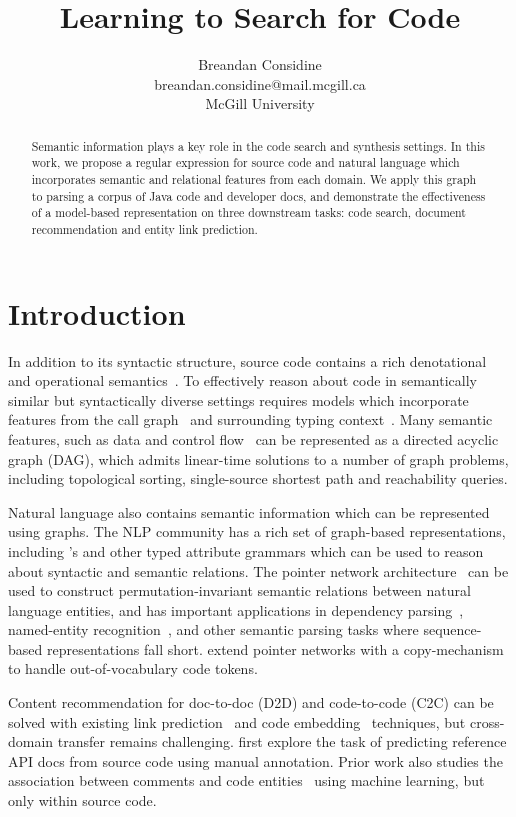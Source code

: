 \documentclass{article}
\title{Learning to Search for Code}
\author{Breandan Considine\\
breandan.considine@mail.mcgill.ca\\
McGill University}
\begin{document}
\maketitle

\begin{abstract}
Semantic information plays a key role in the code search and synthesis settings. In this work, we propose a regular expression for source code and natural language which incorporates semantic and relational features from each domain. We apply this graph to parsing a corpus of Java code and developer docs, and demonstrate the effectiveness of a model-based representation on three downstream tasks: code search, document recommendation and entity link prediction.
\end{abstract}

\section{Introduction}

In addition to its syntactic structure, source code contains a rich denotational and operational semantics~\citep{henkel2018code}. To effectively reason about code in semantically similar but syntactically diverse settings requires models which incorporate features from the call graph~\citep{gu2016deep, liu2019neural} and surrounding typing context~\citep{allamanis2017learning}. Many semantic features, such as data and control flow~\citep{si2018learning} can be represented as a directed acyclic graph (DAG), which admits linear-time solutions to a number of graph problems, including topological sorting, single-source shortest path and reachability queries.

Natural language also contains semantic information which can be represented using graphs. The NLP community has a rich set of graph-based representations, including \citet{reddy2016transforming}'s and other typed attribute grammars which can be used to reason about syntactic and semantic relations. The pointer network architecture~\citep{vinyals2015pointer, vinyals2015order} can be used to construct permutation-invariant semantic relations between natural language entities, and has important applications in dependency parsing~\citep{ma2018stack}, named-entity recognition~\citep{lample2016neural}, and other semantic parsing tasks where sequence-based representations fall short. \citet{li2017code} extend pointer networks with a copy-mechanism to handle out-of-vocabulary code tokens.

Content recommendation for doc-to-doc (D2D) and code-to-code (C2C) can be solved with existing link prediction~\citep{zhang2018link} and code embedding~\citep{gu2018deep} techniques, but cross-domain transfer remains challenging. \citet{robillard2015recommending, robillard2017demand} first explore the task of predicting reference API docs from source code using manual annotation. Prior work also studies the association between comments and code entities~\citep{iyer2018mappingp, anthaplackel2020associating} using machine learning, but only within source code.
\end{document}
